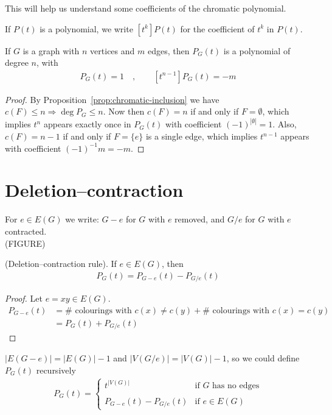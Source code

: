 This will help us understand some coefficients of the chromatic polynomial.

\begin{notation}
If $P(t)$ is a polynomial, we write $[t^k]P(t)$ for the coefficient of $t^k$ in $P(t)$.
\end{notation}
\begin{lemma}
If $G$ is a graph with $n$ vertices and $m$ edges, then $P_G(t)$ is a polynomial of degree $n$, with
\begin{align*}
[t^n]P_G(t)=1\quad , \qquad [t^{n-1}]P_G(t)=-m
\end{align*}
\end{lemma}
\begin{proof}
By Proposition~\ref{prop:chromatic-inclusion} we have $c(F)\le n \Rightarrow \deg P_G \le n$. Now then $c(F)=n $ if and only if $F=\emptyset$, which implies $t^n$ appears exactly once in $P_G(t)$ with coefficient $(-1)^{|\emptyset|}=1$. Also, $c(F)=n-1$ if and only if $F=\lbrace e\rbrace$ is a single edge, which implies $t^{n-1}$ appears with coefficient $(-1)^{-1}m=-m$.
\end{proof}

\section{Deletion--contraction}

\begin{notation}
For $e\in E(G)$ we write: $G-e$ for $G$ with $e$ removed, and $G/e$ for $G$ with $e$ contracted. \\
(FIGURE)
\end{notation}
\begin{proposition}
(Deletion--contraction rule). If $e\in E(G)$, then
\begin{align*}
P_G(t)=P_{G-e}(t)-P_{G/e}(t)
\end{align*}
\end{proposition}
\begin{proof}
Let $e=xy\in E(G)$.
\begin{align*}
P_{G-e}(t)&=\#\text{ colourings with } c(x)\neq c(y) + \# \text{ colourings with } c(x)=c(y) \\
&= P_G(t)+P_{G/e}(t)
\end{align*}
\end{proof}
\begin{remark}
$|E(G-e)|=|E(G)|-1$ and $|V(G/e)|=|V(G)|-1$, so we could define $P_G(t)$ recursively
\begin{align*}
P_G(t) = \left\lbrace \begin{array}{ll}
t^{|V(G)|} & \text{if } G \text{ has no edges}\\
 & \\
P_{G-e}(t)-P_{G/e}(t) & \text{if } e\in E(G)
\end{array} \right.
\end{align*}
\end{remark}

